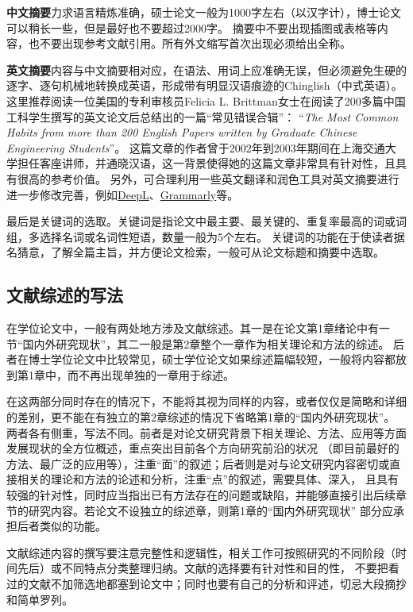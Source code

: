 \textbf{中文摘要}力求语言精炼准确，硕士论文一般为1000字左右（以汉字计），博士论文可以稍长一些，但是最好也不要超过2000字。
摘要中不要出现插图或表格等内容，也不要出现参考文献引用。所有外文缩写首次出现必须给出全称。

\textbf{英文摘要}内容与中文摘要相对应，在语法、用词上应准确无误，但必须避免生硬的逐字、逐句机械地转换成英语，形成带有明显汉语痕迹的Chinglish（中式英语）。
这里推荐阅读一位美国的专利审核员Felicia L. Brittman女士在阅读了200多篇中国工科学生撰写的英文论文后总结出的一篇“常见错误合辑”：
“\textit{The Most Common Habits from more than 200 English Papers written by Graduate Chinese Engineering Students}”。
这篇文章的作者曾于2002年到2003年期间在上海交通大学担任客座讲师，并通晓汉语，这一背景使得她的这篇文章非常具有针对性，且具有很高的参考价值。
另外，可合理利用一些英文翻译和润色工具对英文摘要进行进一步修改完善，例如\href{https://www.deepl.com/}{DeepL}、\href{https://www.grammarly.com/}{Grammarly}等。

最后是关键词的选取。关键词是指论文中最主要、最关键的、重复率最高的词或词组，多选择名词或名词性短语，数量一般为5个左右。
关键词的功能在于使读者据名猜意，了解全篇主旨，并方便论文检索，一般可从论文标题和摘要中选取。

\subsection{文献综述的写法}

在学位论文中，一般有两处地方涉及文献综述。其一是在论文第1章绪论中有一节“国内外研究现状”，其二一般是第2章整个一章作为相关理论和方法的综述。
后者在博士学位论文中比较常见，硕士学位论文如果综述篇幅较短，一般将内容都放到第1章中，而不再出现单独的一章用于综述。

在这两部分同时存在的情况下，不能将其视为同样的内容，或者仅仅是简略和详细的差别，更不能在有独立的第2章综述的情况下省略第1章的“国内外研究现状”。
两者各有侧重，写法不同。前者是对论文研究背景下相关理论、方法、应用等方面发展现状的全方位概述，重点突出目前各个方向研究前沿的状况
（即目前最好的方法、最广泛的应用等），注重“面”的叙述；后者则是对与论文研究内容密切或直接相关的理论和方法的论述和分析，注重“点”的叙述，需要具体、深入，
且具有较强的针对性，同时应当指出已有方法存在的问题或缺陷，并能够直接引出后续章节的研究内容。若论文不设独立的综述章，则第1章的“国内外研究现状”
部分应承担后者类似的功能。

文献综述内容的撰写要注意完整性和逻辑性，相关工作可按照研究的不同阶段（时间先后）或不同特点分类整理归纳。文献的选择要有针对性和目的性，
不要把看过的文献不加筛选地都塞到论文中；同时也要有自己的分析和评述，切忌大段摘抄和简单罗列。

